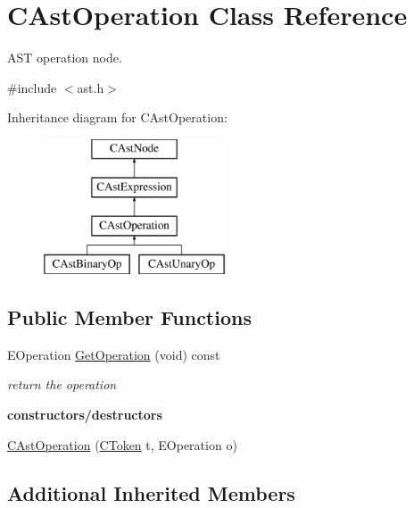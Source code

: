 \hypertarget{classCAstOperation}{\section{C\-Ast\-Operation Class Reference}
\label{classCAstOperation}
}


A\-S\-T operation node.  




{\ttfamily \#include $<$ast.\-h$>$}

Inheritance diagram for C\-Ast\-Operation\-:\begin{figure}[H]
\begin{center}
\leavevmode
\includegraphics[height=4.000000cm]{classCAstOperation}
\end{center}
\end{figure}
\subsection*{Public Member Functions}
\begin{DoxyCompactItemize}
\item 
E\-Operation \hyperlink{classCAstOperation_a244ad192575b3068de928f3479093919}{Get\-Operation} (void) const 
\begin{DoxyCompactList}\small\item\em return the operation \end{DoxyCompactList}\end{DoxyCompactItemize}
\begin{Indent}{\bf constructors/destructors}\par
\begin{DoxyCompactItemize}
\item 
\hyperlink{classCAstOperation_a06479d7d1a54833ce32ea170cb3c3294}{C\-Ast\-Operation} (\hyperlink{classCToken}{C\-Token} t, E\-Operation o)
\end{DoxyCompactItemize}
\end{Indent}
\subsection*{Additional Inherited Members}


